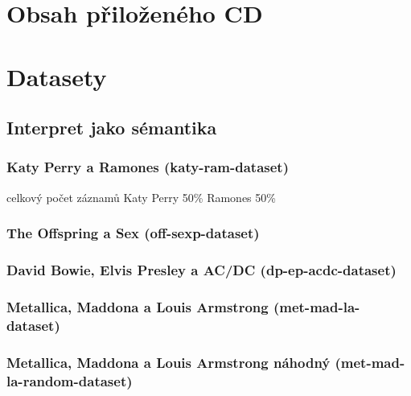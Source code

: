 \documentclass[thesis=M,czech]{FITthesis}[2012/06/26]
\begin{document}
\chapter{Obsah přiloženého CD}


\begin{figure}
\end{figure}


\chapter{Datasety}

\section{Interpret jako sémantika}

\subsection{Katy Perry a Ramones (katy-ram-dataset)}\label{sec:katy-ram-dataset}

celkový počet záznamů
Katy Perry 50\%
Ramones 50\%

\subsection{The Offspring a Sex (off-sexp-dataset)}\label{sec:off-sexp-dataset}

\subsection{David Bowie, Elvis Presley a AC/DC (dp-ep-acdc-dataset)}\label{sec:dp-ep-acdc-dataset}

\subsection{Metallica, Maddona a Louis Armstrong (met-mad-la-dataset)}\label{sec:met-mad-la-dataset}

\subsection{Metallica, Maddona a Louis Armstrong náhodný (met-mad-la-random-dataset)}\label{sec:met-mad-la-random-dataset}
\end{document}
